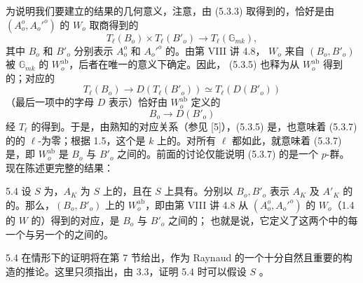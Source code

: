 为说明我们要建立的结果的几何意义，注意，由 (5.3.3) 取得到的，恰好是由 $(A_o^o,A_o'^o)$ 的 $W_o$ 取商得到的
\[
T_\ell(B_o)\times T_\ell(B'_o)\longrightarrow T_\ell(\mathbb G_{mk}),\tag{5.3.5}
\]
其中 $B_o$ 和 $B'_o$ 分别表示 $A_o^o$ 和 $A_o'^o$ 的。由第 VIII 讲 4.8， $W_o$ 来自 $(B_o,B'_o)$ 被 $\mathbb G_{mk}$ 的 $W_o^{\mathrm{ab}}$，后者在唯一的意义下确定。因此， (5.3.5) 也释为从 $W_o^{\mathrm{ab}}$ 得到的；对应的
\[
T_\ell(B_o)\longrightarrow D(T_\ell(B'_o))\simeq T_\ell(D(B'_o))\tag{5.3.6}
\]
（最后一项中的字母 $D$ 表示）恰好由 $W_o^{\mathrm{ab}}$ 定义的
\[
B_o\longrightarrow D(B'_o)\tag{5.3.7}
\]
经 $T_\ell$ 的得到。于是，由熟知的对应关系（参见 [5]），(5.3.5) 是，也意味着 (5.3.7) 的的 $\ell$-为零；根据 1.5，这个是 $k$ 上的。对所有 $\ell$ 都如此，就意味着 (5.3.7) 是，即 $W_o^{\mathrm{ab}}$ 是 $B_o$ 与 $B'_o$ 之间的。前面的讨论仅能说明 (5.3.7) 的是一个 $p$-群。现在陈述更完整的结果：
\begin{SGAresult}{}{5.4}
设 $S$ 为，$A_K$ 为 $S$ 上的，且在 $S$ 上具有。分别以 $B_o,B'_o$ 表示 $A_K$ 及 $A'_K$ 的 的。那么，$(B_o,B'_o)$ 上的 $W_o^{\mathrm{ab}}$，即由第 VIII 讲 4.8 从 $(A_o^o,A_o'^o)$ 的 $W_o$（1.4 的 $W$ 的）得到的对应，是 $B_o$ 与 $B'_o$ 之间的；
也就是说，它定义了这两个中的每一个与另一个的之间的。
\end{SGAresult}
5.4 在情形下的证明将在第 7 节给出，作为 Raynaud 的一个十分自然且重要的构造的推论。这里只须指出，由 3.3，证明 5.4 时可以假设 $S$ 。

